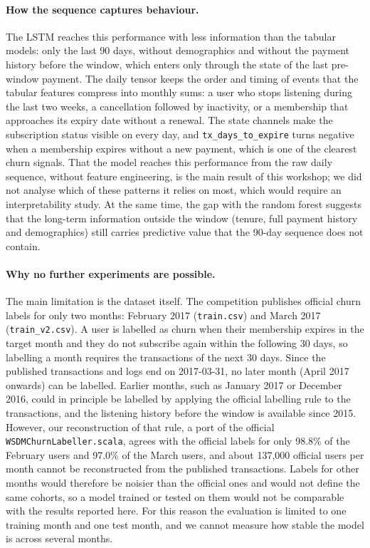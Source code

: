 \documentclass{article}
\begin{document}
\paragraph{How the sequence captures behaviour.} The LSTM reaches this performance with less information than the tabular models: only the last 90 days, without demographics and without the payment history before the window, which enters only through the state of the last pre-window payment. The daily tensor keeps the order and timing of events that the tabular features compress into monthly sums: a user who stops listening during the last two weeks, a cancellation followed by inactivity, or a membership that approaches its expiry date without a renewal. The state channels make the subscription status visible on every day, and \texttt{tx\_days\_to\_expire} turns negative when a membership expires without a new payment, which is one of the clearest churn signals. That the model reaches this performance from the raw daily sequence, without feature engineering, is the main result of this workshop; we did not analyse which of these patterns it relies on most, which would require an interpretability study. At the same time, the gap with the random forest suggests that the long-term information outside the window (tenure, full payment history and demographics) still carries predictive value that the 90-day sequence does not contain.

\paragraph{Why no further experiments are possible.} The main limitation is the dataset itself. The competition publishes official churn labels for only two months: February 2017 (\texttt{train.csv}) and March 2017 (\texttt{train\_v2.csv}). A user is labelled as churn when their membership expires in the target month and they do not subscribe again within the following 30 days, so labelling a month requires the transactions of the next 30 days. Since the published transactions and logs end on 2017-03-31, no later month (April 2017 onwards) can be labelled. Earlier months, such as January 2017 or December 2016, could in principle be labelled by applying the official labelling rule to the transactions, and the listening history before the window is available since 2015. However, our reconstruction of that rule, a port of the official \texttt{WSDMChurnLabeller.scala}, agrees with the official labels for only 98.8\% of the February users and 97.0\% of the March users, and about 137{,}000 official users per month cannot be reconstructed from the published transactions. Labels for other months would therefore be noisier than the official ones and would not define the same cohorts, so a model trained or tested on them would not be comparable with the results reported here. For this reason the evaluation is limited to one training month and one test month, and we cannot measure how stable the model is across several months.
\end{document}
